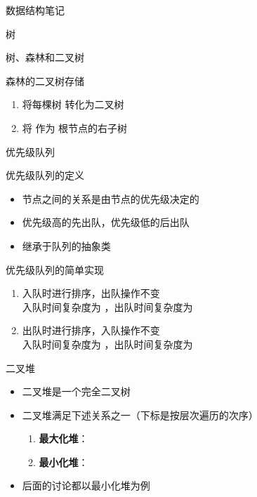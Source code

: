 \documentclass[
  ignorenonframetext,
]{beamer}
\providecommand{\tightlist}{%
  \setlength{\itemsep}{0pt}\setlength{\parskip}{0pt}}
\begin{document}
\begin{frame}[fragile]{数据结构笔记}
\begin{block}{树}
\begin{block}{树、森林和二叉树}
\begin{block}{森林的二叉树存储}
\protect{}\label{ux68eeux6797ux7684ux4e8cux53c9ux6811ux5b58ux50a8}
\begin{enumerate}
\tightlist
\item
  将每棵树 {} 转化为二叉树 {}
\item
  将 {} 作为 {} 根节点的右子树
\end{enumerate}
\end{block}
\end{block}
\end{block}

\begin{block}{优先级队列}
\protect{}\label{ux4f18ux5148ux7ea7ux961fux5217}
\begin{block}{优先级队列的定义}
\protect{}\label{ux4f18ux5148ux7ea7ux961fux5217ux7684ux5b9aux4e49}
\begin{itemize}
\tightlist
\item
  节点之间的关系是由节点的优先级决定的
\item
  优先级高的先出队，优先级低的后出队
\item
  继承于队列的抽象类
\end{itemize}
\end{block}

\begin{block}{优先级队列的简单实现}
\protect{}\label{ux4f18ux5148ux7ea7ux961fux5217ux7684ux7b80ux5355ux5b9eux73b0}
\begin{enumerate}
\tightlist
\item
  入队时进行排序，出队操作不变\\
  入队时间复杂度为 {}，出队时间复杂度为 {}
\item
  出队时进行排序，入队操作不变\\
  入队时间复杂度为 {}，出队时间复杂度为 {}
\end{enumerate}
\end{block}

\begin{block}{二叉堆}
\protect{}\label{ux4e8cux53c9ux5806}
\begin{itemize}
\tightlist
\item
  二叉堆是一个完全二叉树
\item
  二叉堆满足下述关系之一（下标是按层次遍历的次序）

  \begin{enumerate}
  \tightlist
  \item
    \textbf{最大化堆}：{}
  \item
    \textbf{最小化堆}：{}
  \end{enumerate}
\item
  后面的讨论都以最小化堆为例
\end{itemize}


\end{block}
\end{block}
\end{frame}
\end{document}
